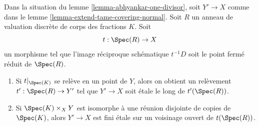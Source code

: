 \begin{lemma}
\label{lemma-tame-covering-split}
Dans la situation du lemme \ref{lemma-abhyankar-one-divisor},
soit $Y' \to X$ comme dans le lemme \ref{lemma-extend-tame-covering-normal}.
Soit $R$ un anneau de valuation discrète de corps des fractions $K$.
Soit
$$
t : \Spec(R) \to X
$$
un morphisme tel que l'image réciproque schématique
$t^{-1}D$ soit le point fermé réduit de $\Spec(R)$.
\begin{enumerate}
\item Si $t|_{\Spec(K)}$ se relève en un point de $Y$, alors
on obtient un relèvement $t' : \Spec(R) \to Y'$ tel que $Y' \to X$
soit \'etale le long de $t'(\Spec(R))$.
\item Si $\Spec(K) \times_X Y$ est isomorphe à une réunion disjointe
de copies de $\Spec(K)$, alors $Y' \to X$ est fini \'etale
sur un voisinage ouvert de $t(\Spec(R))$.
\end{enumerate}
\end{lemma}


